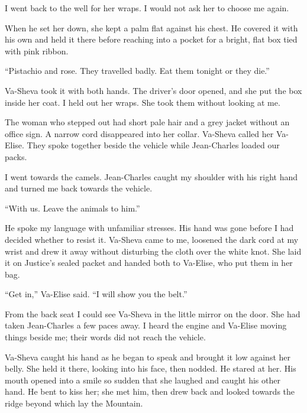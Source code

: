 I went back to the well for her wraps. I would not ask her to choose me again.\par

When he set her down, she kept a palm flat against his chest. He covered it with his own and held it there before reaching into a pocket for a bright, flat box tied with pink ribbon.\par

``Pistachio and rose. They travelled badly. Eat them tonight or they die.''\par

Va-Sheva took it with both hands. The driver's door opened, and she put the box inside her coat. I held out her wraps. She took them without looking at me.\par

The woman who stepped out had short pale hair and a grey jacket without an office sign. A narrow cord disappeared into her collar. Va-Sheva called her Va-Elise. They spoke together beside the vehicle while Jean-Charles loaded our packs.\par

I went towards the camels. Jean-Charles caught my shoulder with his right hand and turned me back towards the vehicle.\par

``With us. Leave the animals to him.''\par

He spoke my language with unfamiliar stresses. His hand was gone before I had decided whether to resist it. Va-Sheva came to me, loosened the dark cord at my wrist and drew it away without disturbing the cloth over the white knot. She laid it on Justice's sealed packet and handed both to Va-Elise, who put them in her bag.\par

``Get in,'' Va-Elise said. ``I will show you the belt.''\par

From the back seat I could see Va-Sheva in the little mirror on the door. She had taken Jean-Charles a few paces away. I heard the engine and Va-Elise moving things beside me; their words did not reach the vehicle.\par

Va-Sheva caught his hand as he began to speak and brought it low against her belly. She held it there, looking into his face, then nodded. He stared at her. His mouth opened into a smile so sudden that she laughed and caught his other hand. He bent to kiss her; she met him, then drew back and looked towards the ridge beyond which lay the Mountain.\par

